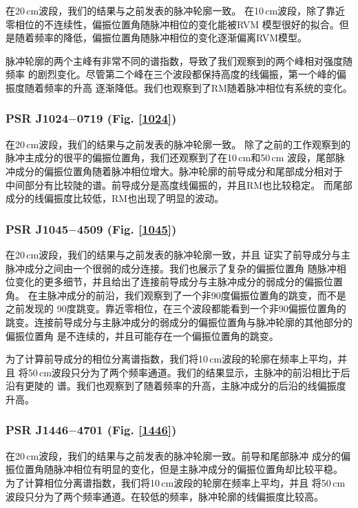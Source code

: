 在20\,cm波段，我们的结果与之前发表的脉冲轮廓一致\supercite{1022Kramer99,Stairs99,Ord04,Yan11a}。
在10\,cm波段，除了靠近零相位的不连续性，偏振位置角随脉冲相位的变化能被RVM
模型很好的拟合。但是随着频率的降低，偏振位置角随脉冲相位的变化逐渐偏离RVM模型。

脉冲轮廓的两个主峰有非常不同的谱指数，导致了我们观察到的两个峰相对强度随频率
的剧烈变化。尽管第二个峰在三个波段都保持高度的线偏振，第一个峰的偏振度随着频率的升高
逐渐降低。我们也观察到了RM随着脉冲相位有系统的变化。

\subsubsection{PSR J1024$-$0719 (Fig. \ref{1024})}

在20\,cm波段，我们的结果与之前发表的脉冲轮廓一致\supercite{Ord04,Yan11a}。
除了之前的工作观察到的脉冲主成分的很平的偏振位置角，我们还观察到了在10\,cm和50\,cm
波段，尾部脉冲成分的偏振位置角随着脉冲相位增大。脉冲轮廓的前导成分和尾部成分相对于
中间部分有比较陡的谱。前导成分是高度线偏振的，并且RM也比较稳定。
而尾部成分的线偏振度比较低，RM也出现了明显的波动。

\subsubsection{PSR J1045$-$4509 (Fig. \ref{1045})}

在20\,cm波段，我们的结果与之前发表的脉冲轮廓一致\supercite{Ord04,Yan11a}，并且
证实了前导成分与主脉冲成分之间由一个很弱的成分连接。我们也展示了复杂的偏振位置角
随脉冲相位变化的更多细节，并且给出了连接前导成分与主脉冲成分的弱成分的偏振位置角。
在主脉冲成分的前沿，我们观察到了一个非90度偏振位置角的跳变，而不是之前发现的
90度跳变\supercite{Yan11a}。靠近零相位，在三个波段都能看到一个非90偏振位置角的
跳变。连接前导成分与主脉冲成分的弱成分的偏振位置角与脉冲轮廓的其他部分的偏振位置角
是不连续的，并且可能存在一个偏振位置角的跳变。

为了计算前导成分的相位分离谱指数，我们将10\,cm波段的轮廓在频率上平均，并且
将50\,cm波段只分为了两个频率通道。我们的结果显示，主脉冲的前沿相比于后沿有更陡的
谱。我们也观察到了随着频率的升高，主脉冲成分的后沿的线偏振度升高。


\subsubsection{PSR J1446$-$4701 (Fig. \ref{1446})}

在20\,cm波段，我们的结果与之前发表的脉冲轮廓一致\supercite{Keith12}。前导和尾部脉冲
成分的偏振位置角随脉冲相位有明显的变化，但是主脉冲成分的偏振位置角却比较平稳。
为了计算相位分离谱指数，我们将10\,cm波段的轮廓在频率上平均，并且
将50\,cm波段只分为了两个频率通道。在较低的频率，脉冲轮廓的线偏振度比较高。

